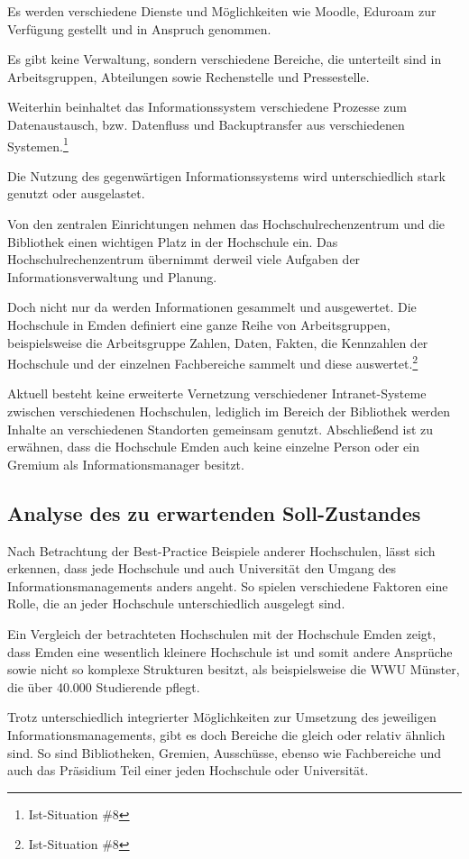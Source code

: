 Es werden verschiedene Dienste und Möglichkeiten wie Moodle, Eduroam zur Verfügung gestellt und in Anspruch genommen.

Es gibt keine Verwaltung, sondern verschiedene Bereiche, die unterteilt sind in Arbeitsgruppen, Abteilungen sowie Rechenstelle und Pressestelle.

Weiterhin beinhaltet das Informationssystem verschiedene Prozesse zum 
Datenaustausch, bzw. Datenfluss 
und Backuptransfer  aus verschiedenen Systemen.\footnote{Ist-Situation \#8}

Die Nutzung des gegenwärtigen Informationssystems wird unterschiedlich stark genutzt oder ausgelastet.

Von den zentralen Einrichtungen nehmen das Hochschulrechenzentrum und die Bibliothek einen wichtigen Platz in der Hochschule ein. Das Hochschulrechenzentrum übernimmt derweil viele Aufgaben der Informationsverwaltung und Planung.

Doch nicht nur da werden Informationen gesammelt und ausgewertet. Die 
Hochschule in Emden definiert eine ganze Reihe von Arbeitsgruppen, 
beispielsweise die Arbeitsgruppe Zahlen, Daten, Fakten, die Kennzahlen der 
Hochschule und der einzelnen Fachbereiche sammelt und diese 
auswertet.\footnote{Ist-Situation \#8}

Aktuell besteht keine erweiterte Vernetzung verschiedener Intranet-Systeme 
zwischen verschiedenen Hochschulen, lediglich im Bereich der Bibliothek 
werden Inhalte an verschiedenen Standorten gemeinsam genutzt. 
Abschließend ist zu erwähnen, dass die Hochschule Emden auch keine 
einzelne Person oder ein Gremium  als Informationsmanager besitzt.

\subsection{Analyse des zu erwartenden Soll-Zustandes}
Nach Betrachtung der Best-Practice Beispiele anderer Hochschulen, lässt sich erkennen, dass jede Hochschule und auch Universität den Umgang des Informationsmanagements anders angeht. So spielen verschiedene Faktoren eine Rolle, die an jeder Hochschule unterschiedlich ausgelegt sind.

Ein Vergleich der betrachteten Hochschulen mit der Hochschule Emden zeigt, dass Emden eine wesentlich kleinere Hochschule ist und somit andere Ansprüche sowie nicht so komplexe Strukturen besitzt, als beispielsweise die WWU Münster, die über 40.000 Studierende pflegt.

Trotz unterschiedlich integrierter Möglichkeiten zur Umsetzung des jeweiligen Informationsmanagements, gibt es doch Bereiche die gleich oder relativ ähnlich sind. So sind Bibliotheken, Gremien, Ausschüsse, ebenso wie Fachbereiche und auch das Präsidium Teil einer jeden Hochschule oder Universität.

